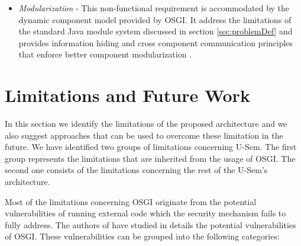 \begin{itemize}
\item \textit{Modularization} - This non-functional requirement is accommodated by the dynamic component model provided by OSGI. It address the limitations of the standard Java module system discussed in section \ref{sec:problemDef} and provides information hiding and cross component communication principles that enforce better component modularization \cite{Andre}.

\end{itemize}


\section{Limitations and Future Work}
\label{sec:limits}

In this section we identify the limitations of the proposed architecture and we also suggest approaches that can be used to overcome these limitation in the future. We have identified two groups of limitations concerning U-Sem. The first group represents the limitations that are inherited from the usage of OSGI. The second one consists of the limitations concerning the rest of the U-Sem's architecture.

Most of the limitations concerning OSGI originate from the potential vulnerabilities of running external code which the security mechanism fails to fully address. The authors of \cite{Parrend} have studied in details the potential vulnerabilities of OSGI. These vulnerabilities can be grouped into the following categories:

